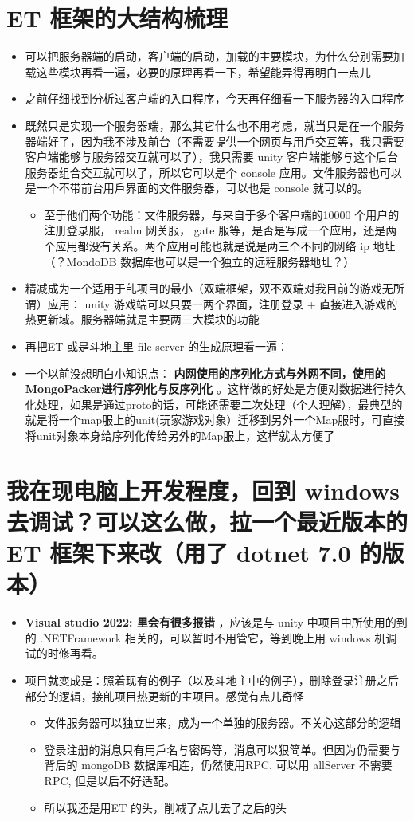 \documentclass[9pt, b5paper]{article}
\begin{document}
\section{ET 框架的大结构梳理}
\label{sec-7}
\begin{itemize}
\item 可以把服务器端的启动，客户端的启动，加载的主要模块，为什么分别需要加载这些模块再看一遍，必要的原理再看一下，希望能弄得再明白一点儿
\item 之前仔细找到分析过客户端的入口程序，今天再仔细看一下服务器的入口程序
\item 既然只是实现一个服务器端，那么其它什么也不用考虑，就当只是在一个服务器端好了，因为我不涉及前台（不需要提供一个网页与用戶交互等，我只需要客户端能够与服务器交互就可以了），我只需要 unity 客户端能够与这个后台服务器组合交互就可以了，所以它可以是个 console 应用。文件服务器也可以是一个不带前台用戶界面的文件服务器，可以也是 console 就可以的。
\begin{itemize}
\item 至于他们两个功能：文件服务器，与来自于多个客户端的10000 个用户的注册登录服， realm 网关服， gate 服等，是否是写成一个应用，还是两个应用都没有关系。两个应用可能也就是说是两三个不同的网络 ip 地圵（？MondoDB 数据库也可以是一个独立的远程服务器地圵？）
\end{itemize}
\item 精减成为一个适用于臫项目的最小（双端框架，双不双端对我目前的游戏无所谓）应用： unity 游戏端可以只要一两个界面，注册登录 + 直接进入游戏的热更新域。服务器端就是主要两三大模块的功能
\item 再把ET 或是斗地主里 file-server 的生成原理看一遍：
\item 一个以前没想明白小知识点： \textbf{内网使用的序列化方式与外网不同，使用的MongoPacker进行序列化与反序列化} 。这样做的好处是方便对数据进行持久化处理，如果是通过proto的话，可能还需要二次处理（个人理解），最典型的就是将一个map服上的unit(玩家游戏对象）迁移到另外一个Map服时，可直接将unit对象本身给序列化传给另外的Map服上，这样就太方便了
\end{itemize}
\section{我在现电脑上开发程度，回到 windows 去调试？可以这么做，拉一个最近版本的ET 框架下来改（用了 dotnet 7.0 的版本）}
\label{sec-8}
\begin{itemize}
\item \textbf{Visual studio 2022: 里会有很多报错} ，应该是与 unity 中项目中所使用的到的 .NETFramework 相关的，可以暂时不用管它，等到晚上用 windows 机调试的时修再看。
\item 项目就变成是：照着现有的例子（以及斗地主中的例子），删除登录注册之后部分的逻辑，接臫项目热更新的主项目。感觉有点儿奇怪
\begin{itemize}
\item 文件服务器可以独立出来，成为一个单独的服务器。不关心这部分的逻辑
\item 登录注册的消息只有用戶名与密码等，消息可以狠简单。但因为仍需要与背后的 mongoDB 数据库相连，仍然使用RPC. 可以用 allServer 不需要 RPC, 但是以后不好适配。
\item 所以我还是用ET 的头，削减了点儿去了之后的头
\end{itemize}
\end{itemize}
\end{document}
